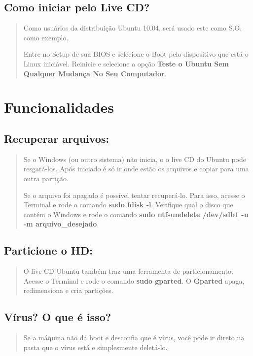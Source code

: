\documentclass[12pt, a4paper, tocpage=plain]{abnt} %
\begin{document}
\section{Como iniciar pelo Live CD?}

\begin{quote}
Como usuários da distribuição Ubuntu 10.04, será usado este como S.O. como exemplo.

Entre no Setup de sua BIOS e selecione o Boot pelo dispositivo que está o Linux iniciável. Reinicie e selecione a opção {\bf Teste o Ubuntu Sem Qualquer Mudança No Seu Computador}.
\end{quote}

\chapter{Funcionalidades}


\section{Recuperar arquivos:}

\begin{quote}
Se o Windows (ou outro sistema) não inicia, o o live CD do Ubuntu pode resgatá-los. Após iniciado é só ir onde estão os arquivos e copiar para uma outra partição. 

Se o arquivo foi apagado é possível tentar recuperá-lo. Para isso, acesse o Terminal e rode o comando  {\bf sudo fdisk -l}. Verifique qual o disco que contém o Windows e rode o comando {\bf sudo ntfsundelete /dev/sdb1 -u -m arquivo\_desejado}.
\end{quote}

\section{Particione o HD:}

\begin{quote}
O live CD Ubuntu também traz uma ferramenta de particionamento. Acesse o Terminal e rode o comando {\bf sudo gparted}. O {\bf Gparted} apaga, redimensiona e cria partições.
\end{quote}

\section{Vírus? O que é isso?}

\begin{quote}
Se a máquina não dá boot e desconfia que é vírus, você pode ir direto na pasta que o vírus está e simplesmente deletá-lo.
\end{quote}
\end{document}
